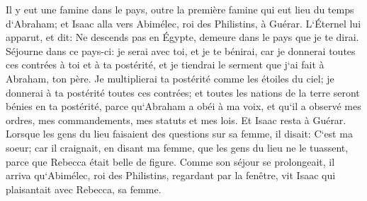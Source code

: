 \verse Il y eut une famine dans le pays, outre la première famine qui eut lieu du temps d`Abraham; et Isaac alla vers Abimélec, roi des Philistins, à Guérar. 
\verse L`Éternel lui apparut, et dit: Ne descends pas en Égypte, demeure dans le pays que je te dirai. 
\verse Séjourne dans ce pays-ci: je serai avec toi, et je te bénirai, car je donnerai toutes ces contrées à toi et à ta postérité, et je tiendrai le serment que j`ai fait à Abraham, ton père. 
\verse Je multiplierai ta postérité comme les étoiles du ciel; je donnerai à ta postérité toutes ces contrées; et toutes les nations de la terre seront bénies en ta postérité, 
\verse parce qu`Abraham a obéi à ma voix, et qu`il a observé mes ordres, mes commandements, mes statuts et mes lois. 
\verse Et Isaac resta à Guérar. 
\verse Lorsque les gens du lieu faisaient des questions sur sa femme, il disait: C`est ma soeur; car il craignait, en disant ma femme, que les gens du lieu ne le tuassent, parce que Rebecca était belle de figure. 
\verse Comme son séjour se prolongeait, il arriva qu`Abimélec, roi des Philistins, regardant par la fenêtre, vit Isaac qui plaisantait avec Rebecca, sa femme. 
